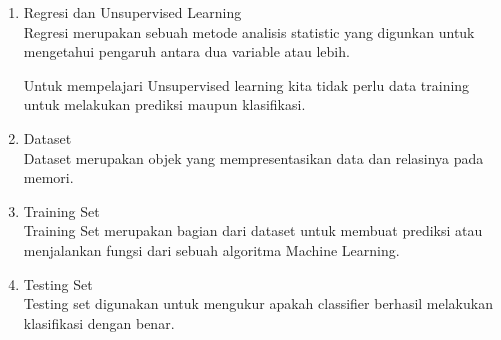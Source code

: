 \begin{enumerate}
\item Regresi dan Unsupervised Learning\\
Regresi merupakan sebuah metode analisis statistic yang digunkan untuk mengetahui pengaruh antara dua variable atau lebih.

Untuk mempelajari Unsupervised learning kita tidak perlu data training untuk melakukan prediksi maupun klasifikasi.

\item Dataset\\
Dataset merupakan objek yang mempresentasikan data dan relasinya pada memori.

\item Training Set\\
Training Set merupakan bagian dari dataset untuk membuat prediksi atau menjalankan fungsi dari sebuah algoritma Machine Learning.

\item Testing Set\\
Testing set digunakan untuk mengukur apakah classifier berhasil melakukan klasifikasi dengan benar.

\end{enumerate}


